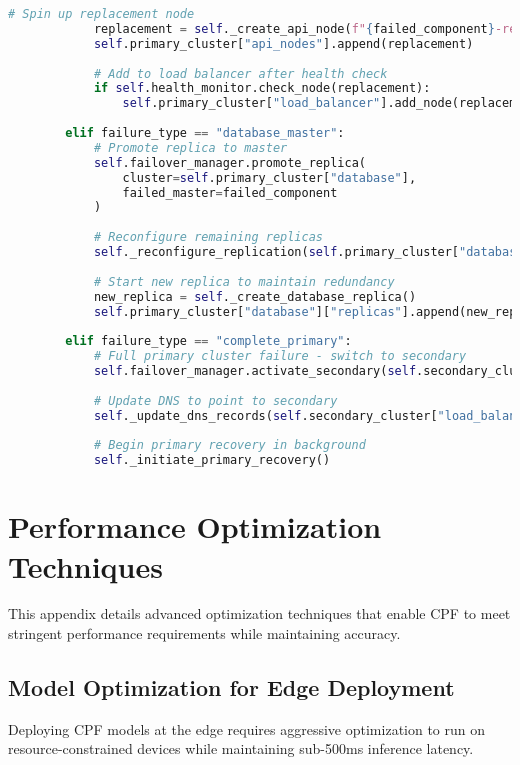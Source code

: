 \documentclass[11pt,a4paper]{article}
\begin{document}
\begin{lstlisting}[language=Python, caption=High-Availability CPF Configuration]
            # Spin up replacement node
            replacement = self._create_api_node(f"{failed_component}-replacement")
            self.primary_cluster["api_nodes"].append(replacement)
            
            # Add to load balancer after health check
            if self.health_monitor.check_node(replacement):
                self.primary_cluster["load_balancer"].add_node(replacement)
        
        elif failure_type == "database_master":
            # Promote replica to master
            self.failover_manager.promote_replica(
                cluster=self.primary_cluster["database"],
                failed_master=failed_component
            )
            
            # Reconfigure remaining replicas
            self._reconfigure_replication(self.primary_cluster["database"])
            
            # Start new replica to maintain redundancy
            new_replica = self._create_database_replica()
            self.primary_cluster["database"]["replicas"].append(new_replica)
        
        elif failure_type == "complete_primary":
            # Full primary cluster failure - switch to secondary
            self.failover_manager.activate_secondary(self.secondary_cluster)
            
            # Update DNS to point to secondary
            self._update_dns_records(self.secondary_cluster["load_balancer"])
            
            # Begin primary recovery in background
            self._initiate_primary_recovery()
\end{lstlisting}

\section{Performance Optimization Techniques}
\label{app:optimization}

This appendix details advanced optimization techniques that enable CPF to meet stringent performance requirements while maintaining accuracy.

\subsection{Model Optimization for Edge Deployment}

Deploying CPF models at the edge requires aggressive optimization to run on resource-constrained devices while maintaining sub-500ms inference latency.
\end{document}
